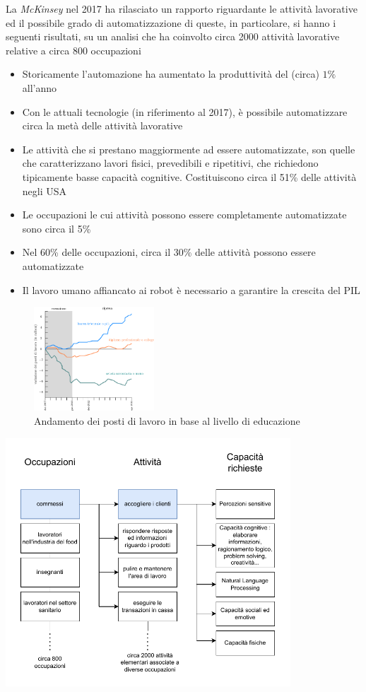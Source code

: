 \documentclass[10pt, letterpaper]{report}
\begin{document}
La \textit{McKinsey} nel 2017 ha rilasciato un rapporto riguardante le attività lavorative ed il possibile 
grado di automatizzazione di queste, in particolare, si hanno i seguenti risultati, su un analisi che ha coinvolto 
circa 2000 attività lavorative relative a circa 800 occupazioni\begin{itemize}
    \item Storicamente l'automazione ha aumentato la produttività del (circa) $1\%$ all'anno
    \item Con le attuali tecnologie (in riferimento al 2017), è possibile automatizzare circa la metà delle 
    attività lavorative 
    \item Le attività che si prestano maggiormente ad essere automatizzate, son quelle che caratterizzano lavori 
    fisici, prevedibili e ripetitivi, che richiedono tipicamente basse capacità cognitive. Costituiscono circa 
    il 51\% delle attività negli USA
    \item Le occupazioni le cui attività possono essere completamente automatizzate sono circa il 5\% 
    \item Nel 60\% delle occupazioni, circa il 30\% delle attività possono essere automatizzate
    \item Il lavoro umano affiancato ai robot è necessario a garantire la crescita del PIL
\end{itemize}
\begin{figure}[h!]
    \centering
    \includegraphics[width=0.4\textwidth ]{images/andamentoLavori.eps}
    \caption{Andamento dei posti di lavoro in base al livello di educazione}
\end{figure}
\begin{center}
    \includegraphics[width=0.8\textwidth ]{images/attivitaAutomatizzabili.pdf}
\end{center}
\end{document}
